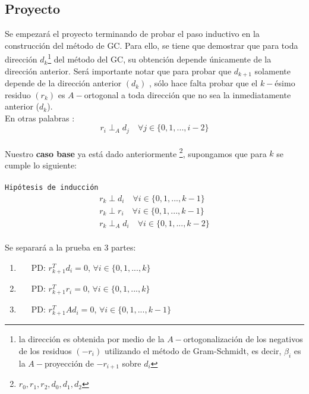 \documentclass[12pt]{article}
\newcommand{\bea}{\begin{eqnarray}}
\newcommand{\eea}{\end{eqnarray}}
\begin{document}
\subsection*{Proyecto}
\noindent Se empezar\'a el proyecto terminando de probar el paso inductivo en la construcci\'on del m\'etodo de GC. Para ello, se tiene que demostrar que para toda direcci\'on $d_k$\footnote{la direcci\'on es obtenida por medio de la $A-$ortogonalizaci\'on de los negativos de los residuos $(-r_i)$ utilizando el m\'etodo de Gram-Schmidt, es decir, $\beta_i$ es la $A-$proyecci\'on de $-r_{i+1}$ sobre $d_i$} del m\'etodo del GC, su obtenci\'on depende \'unicamente de la direcci\'on anterior. Ser\'a importante notar que para probar que $d_{k+1}$ solamente depende de la direcci\'on anterior $(d_{k})$ , s\'olo hace falta probar que el $k-$\'esimo residuo $(r_k)$ es $A-$ortogonal a toda direcci\'on que no sea la inmediatamente anterior ($d_k$).
 \\
 
 En otras palabras : 
$$ r_i\perp_A d_j     \quad \forall j \in \{0,1, ...  , i-2 \}
$$\\

Nuestro {\bf caso base} ya est\'a dado anteriormente \footnote{$r_0, r_1, r_2, d_0, d_1, d_2$}, supongamos que para $k$ se cumple lo siguiente: \\
\\
{\tt Hip\'otesis de inducci\'on}
\bea
r_k \perp d_i \quad \forall i \in \{0,1, ..., k-1\}\label{rkdi}  \\
r_k \perp r_i \quad \forall i \in \{0,1, ..., k-1\}\label{rkri} \\
r_k \perp_A d_i \quad \forall i \in \{0,1, ..., k-2\}\label{rkAdi}
\eea \\
Se separar\'a a la prueba en 3 partes:
\begin{enumerate}
\item \quad \ \ \ PD:  $r_{k+1}^T d_i= 0$, \quad $\forall i \in \{0,1, ...,k\}$ 
\item \quad \ \ \ PD: $r_{k+1}^T r_i= 0$, \quad $\forall i \in \{0,1, ...,k\} $
\item \quad \ \ \ PD: $r_{k+1}^T A d_i= 0$, \quad $\forall i \in \{0,1, ...,k-1\}$ \\
\end{enumerate}
\end{document}
